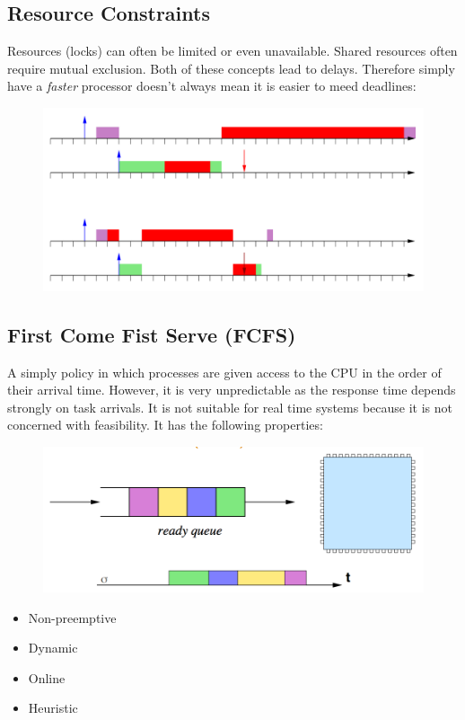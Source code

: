 \documentclass{hw}
\begin{document}
\subsection{Resource Constraints}
Resources (locks) can often be limited or even unavailable. Shared resources 
often require mutual exclusion. Both of these concepts lead to delays. Therefore
simply have a \emph{faster} processor doesn't always mean it is easier to meed
deadlines:
\begin{figure}[H]
  \centering
  \includegraphics[scale=.6]{faster}
\end{figure}

\subsection{First Come Fist Serve (FCFS)}
A simply policy in which processes are given access to the CPU in the order of 
their arrival time. However, it is very unpredictable as the response time
depends strongly on task arrivals. It is not suitable for real time systems
because it is not concerned with feasibility. It has the following properties:
\begin{figure}[H]
  \centering
  \includegraphics[scale=.5]{fcfs1}
\end{figure}

\begin{itemize}
  \item Non-preemptive
  \item Dynamic
  \item Online
  \item Heuristic
\end{itemize}
\end{document}
